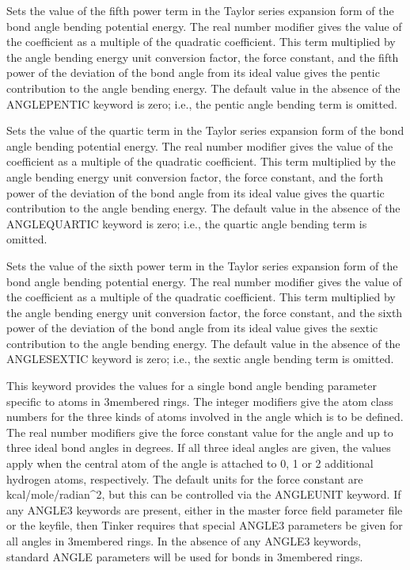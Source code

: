 \documentclass[letterpaper,11pt,english]{sphinxmanual}
\begin{document}
  Sets the value of the fifth power term in the Taylor series expansion form of the bond angle bending potential energy. The real number modifier gives the value of the coefficient as a multiple of the quadratic coefficient. This term multiplied by the angle bending energy unit conversion factor, the force constant, and the fifth power of the deviation of the bond angle from its ideal value gives the pentic contribution to the angle bending energy. The default value in the absence of the ANGLE\sphinxhyphen{}PENTIC keyword is zero; i.e., the pentic angle bending term is omitted.

  Sets the value of the quartic term in the Taylor series expansion form of the bond angle bending potential energy. The real number modifier gives the value of the coefficient as a multiple of the quadratic coefficient. This term multiplied by the angle bending energy unit conversion factor, the force constant, and the forth power of the deviation of the bond angle from its ideal value gives the quartic contribution to the angle bending energy. The default value in the absence of the ANGLE\sphinxhyphen{}QUARTIC keyword is zero; i.e., the quartic angle bending term is omitted.

  Sets the value of the sixth power term in the Taylor series expansion form of the bond angle bending potential energy. The real number modifier gives the value of the coefficient as a multiple of the quadratic coefficient. This term multiplied by the angle bending energy unit conversion factor, the force constant, and the sixth power of the deviation of the bond angle from its ideal value gives the sextic contribution to the angle bending energy. The default value in the absence of the ANGLE\sphinxhyphen{}SEXTIC keyword is zero; i.e., the sextic angle bending term is omitted.

  This keyword provides the values for a single bond angle bending parameter specific to atoms in 3\sphinxhyphen{}membered rings. The integer modifiers give the atom class numbers for the three kinds of atoms involved in the angle which is to be defined. The real number modifiers give the force constant value for the angle and up to three ideal bond angles in degrees. If all three ideal angles are given, the values apply when the central atom of the angle is attached to 0, 1 or 2 additional hydrogen atoms, respectively. The default units for the force constant are kcal/mole/radian\textasciicircum{}2, but this can be controlled via the ANGLEUNIT keyword. If any ANGLE3 keywords are present, either in the master force field parameter file or the keyfile, then Tinker requires that special ANGLE3 parameters be given for all angles in 3\sphinxhyphen{}membered rings. In the absence of any ANGLE3 keywords, standard ANGLE parameters will be used for bonds in 3\sphinxhyphen{}membered rings.
\end{document}
